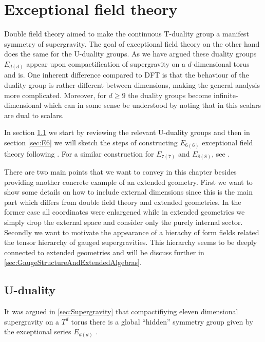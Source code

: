 \chapter{Exceptional field theory\label{chap:ExceptionalFieldTheory}}

Double field theory aimed to make the continuous T-duality group a manifest symmetry of supergravity. The goal of exceptional field theory on the other hand does the same for the U-duality groups. As we have argued these duality groups $E_{d(d)}$ appear upon compactification of supergravity on a $d$-dimensional torus and is. One inherent difference compared to DFT is that the behaviour of the duality group is rather different between dimensions, making the general analysis more complicated. Moreover, for $d\geq 9$ the duality groups become infinite-dimensional which can in some sense be understood by noting that in this scalars are dual to scalars. %

In section \ref{sec:Uduality} we start by reviewing the relevant U-duality groups and then in section \ref{sec:E6} we will sketch the steps of constructing $E_{6(6)}$ exceptional field theory following \cite{E62014}. For a similar construction for $E_{7(7)}$ and $E_{8(8)}$, see \cite{E72014,E82014}. 

There are two main points that we want to convey in this chapter besides providing another concrete example of an extended geometry. First we want to show some details on how to include external dimensions since this is the main part which differs from double field theory and extended geometries. In the former case all coordinates were enlargened while in extended geometries we simply drop the external space and consider only the purely internal sector. Secondly we want to motivate the appearance of a hierachy of form fields related the tensor hierarchy of gauged supergravities. This hierarchy seems to be deeply connected to extended geometries and will be discuss further in \ref{sec:GaugeStructureAndExtendedAlgebras}. 


\section{U-duality}\label{sec:Uduality}
It was argued in \ref{sec:Supergravity} that compactifiying eleven dimensional supergravity on a $T^d$ torus there is a global ``hidden'' symmetry group given by the exceptional series $E_{d(d)}$ \cite{CREMMER197848,Cremmer:1997ct,Hull:1994ys}. 


